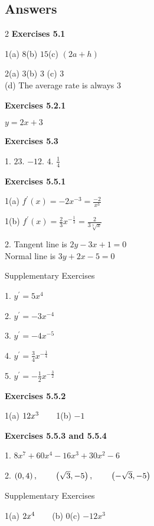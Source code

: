 

\subsection{Answers}
\columnsep =30pt
\begin {multicols}{2}
 \textbf{Exercises 5.1} 

1(a) $8$\qquad (b) $15$\qquad (c) $(2 a +h)$ 

2(a) $3$\qquad (b) $3$ \qquad (c) $3$ \\\relax (d) The average rate is always $3$ 

\textbf{Exercises 5.2.1} 

$y =2 x +3$ 

\textbf{Exercises 5.3} 

1. $23$. $ -12$. $4$. $\frac{1}{4}$ 

\textbf{Exercises 5.5.1} 

1(a) $f^{ \prime } (x) = -2 x^{ -3} =\frac{ -2}{x^{3}}$ 

1(b) $f^{ \prime } \left (x\right ) =\frac{2}{3} x^{ -\frac{1}{3}} =\frac{2}{3 \sqrt[{3}]{x}}$ 

2. Tangent line is $2 y -3 x +1 =0$ \\\relax Normal line is $3 y +2 x -5 =0$ 

Supplementary Exercises 

1. $y^{ \prime } =5 x^{4}$ 

2. $y^{ \prime } = -3 x^{ -4}$ 

3. $y^{ \prime } = -4 x^{ -5}$ 

4. $y^{ \prime } =\frac{3}{4} x^{ -\frac{1}{4}}$ 

5. $y^{ \prime } = -\frac{1}{2} x^{ -\frac{3}{2}}$ 

\textbf{Exercises 5.5.2} 

1(a) $12 x^{3}\text{\quad \quad }$1(b) $ -1$ 

\textbf{Exercises 5.5.3 and 5.5.4} 

1. $8 x^{7} +60 x^{4} -16 x^{3} +30 x^{2} -6$ 

2. $\left (0 ,4\right ) ,\text{\quad \quad }\left (\sqrt{3} , -5\right ) ,\text{\quad \quad }\left ( -\sqrt{3} , -5\right )$ 

Supplementary Exercises 

1(a) $2 x^{4}\text{\quad \quad }$(b) $0$\qquad (c) $ -12 x^{3}$ 


\end{multicols}
